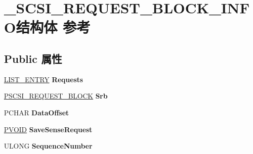 \hypertarget{struct___s_c_s_i___r_e_q_u_e_s_t___b_l_o_c_k___i_n_f_o}{}\section{\+\_\+\+S\+C\+S\+I\+\_\+\+R\+E\+Q\+U\+E\+S\+T\+\_\+\+B\+L\+O\+C\+K\+\_\+\+I\+N\+F\+O结构体 参考}
\label{struct___s_c_s_i___r_e_q_u_e_s_t___b_l_o_c_k___i_n_f_o}
\subsection*{Public 属性}
\begin{DoxyCompactItemize}
\item 
\mbox{\label{struct___s_c_s_i___r_e_q_u_e_s_t___b_l_o_c_k___i_n_f_o_abcc488886d64015d3265b3876e997561}} 
\hyperlink{struct___l_i_s_t___e_n_t_r_y}{L\+I\+S\+T\+\_\+\+E\+N\+T\+RY} {\bfseries Requests}
\item 
\mbox{\label{struct___s_c_s_i___r_e_q_u_e_s_t___b_l_o_c_k___i_n_f_o_a996d952b3990a700ee33312c888874e8}} 
\hyperlink{struct___s_c_s_i___r_e_q_u_e_s_t___b_l_o_c_k}{P\+S\+C\+S\+I\+\_\+\+R\+E\+Q\+U\+E\+S\+T\+\_\+\+B\+L\+O\+CK} {\bfseries Srb}
\item 
\mbox{\label{struct___s_c_s_i___r_e_q_u_e_s_t___b_l_o_c_k___i_n_f_o_a07f209e7758841d4f5f5ece545d806ea}} 
P\+C\+H\+AR {\bfseries Data\+Offset}
\item 
\mbox{\label{struct___s_c_s_i___r_e_q_u_e_s_t___b_l_o_c_k___i_n_f_o_acae83a537c2be9fc6bc7d2aab2cd2245}} 
\hyperlink{interfacevoid}{P\+V\+O\+ID} {\bfseries Save\+Sense\+Request}
\item 
\mbox{\label{struct___s_c_s_i___r_e_q_u_e_s_t___b_l_o_c_k___i_n_f_o_a01dad57a1029aa7ee7578f1586e3d5d8}} 
U\+L\+O\+NG {\bfseries Sequence\+Number}
\item 
\mbox{\label{struct___s_c_s_i___r_e_q_u_e_s_t___b_l_o_c_k___i_n_f_o_a70dbea5e7f6500b012c1291f8f09969f}} 

\end{DoxyCompactItemize}
